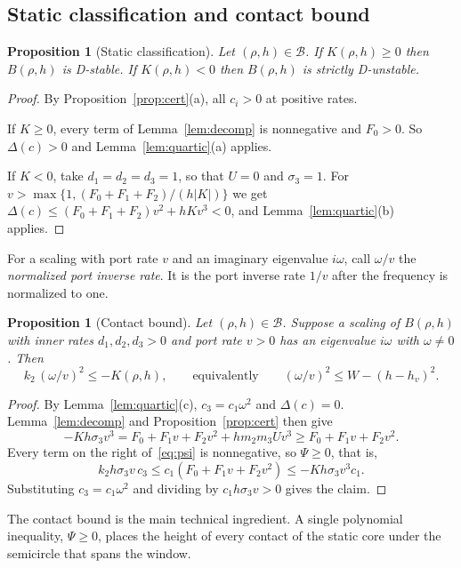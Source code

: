 \documentclass[11pt,a4paper]{article}
\theoremstyle{plain}
\newtheorem{proposition}[theorem]{Proposition}
\theoremstyle{definition}
\theoremstyle{remark}
\newcommand{\cB}{\mathcal{B}}
\begin{document}
\subsection{Static classification and contact bound}

\begin{proposition}[Static classification]\label{prop:static}
Let $(\rho,h)\in\cB$. If $K(\rho,h)\ge0$ then $B(\rho,h)$ is D-stable. If $K(\rho,h)<0$
then $B(\rho,h)$ is strictly D-unstable.
\end{proposition}
\begin{proof}
By Proposition~\ref{prop:cert}(a), all $c_i>0$ at positive rates.

If $K\ge0$, every term of Lemma~\ref{lem:decomp} is nonnegative and $F_0>0$. So
$\Delta(c)>0$ and Lemma~\ref{lem:quartic}(a) applies.

If $K<0$, take $d_1=d_2=d_3=1$, so that $U=0$ and $\sigma_3=1$. For
$v>\max\{1,(F_0+F_1+F_2)/(h|K|)\}$ we get
$\Delta(c)\le(F_0+F_1+F_2)v^2+hKv^3<0$, and Lemma~\ref{lem:quartic}(b) applies.
\end{proof}

For a scaling with port rate $v$ and an imaginary eigenvalue $i\omega$, call
$\omega/v$ the \emph{normalized port inverse rate}. It is the port inverse rate $1/v$
after the frequency is normalized to one.

\begin{proposition}[Contact bound]\label{prop:contact}
Let $(\rho,h)\in\cB$. Suppose a scaling of $B(\rho,h)$ with inner rates $d_1,d_2,d_3>0$
and port rate $v>0$ has an eigenvalue $i\omega$ with $\omega\ne0$. Then
\[
k_2\,(\omega/v)^2\le-K(\rho,h),\qquad\text{equivalently}\qquad (\omega/v)^2\le W-(h-h_v)^2 .
\]
\end{proposition}
\begin{proof}
By Lemma~\ref{lem:quartic}(c), $c_3=c_1\omega^2$ and $\Delta(c)=0$. Lemma~\ref{lem:decomp}
and Proposition~\ref{prop:cert} then give
\[
-Kh\sigma_3v^3=F_0+F_1v+F_2v^2+hm_2m_3Uv^3\ge F_0+F_1v+F_2v^2 .
\]
Every term on the right of~\eqref{eq:psi} is nonnegative, so $\Psi\ge0$, that is,
\[
k_2h\sigma_3v\,c_3\le c_1(F_0+F_1v+F_2v^2)\le-Kh\sigma_3v^3c_1 .
\]
Substituting $c_3=c_1\omega^2$ and dividing by $c_1h\sigma_3v>0$ gives the claim.
\end{proof}

The contact bound is the main technical ingredient. A single polynomial inequality,
$\Psi\ge0$, places the height of every contact of the static core under the semicircle
that spans the window.
\end{document}
